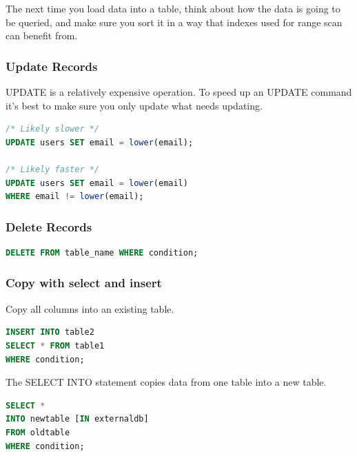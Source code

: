 \documentclass{article}
\begin{document}
The next time you load data into a table, think about how the data is going to be queried, and make sure you sort it in a way that indexes used for range scan can benefit from.

\subsubsection{Update Records}
UPDATE is a relatively expensive operation. To speed up an UPDATE command it's best to make sure you only update what needs updating.

\vspace{8pt} \begin{lstlisting}[language=SQL]
/* Likely slower */
UPDATE users SET email = lower(email); 

/* Likely faster */
UPDATE users SET email = lower(email)
WHERE email != lower(email);
\end{lstlisting} \vspace{8pt}

\subsubsection{Delete Records}

\vspace{8pt} \begin{lstlisting}[language=SQL]
DELETE FROM table_name WHERE condition;
\end{lstlisting} \vspace{8pt}

\subsubsection{Copy with select and insert}
Copy all columns into an existing table.

\vspace{8pt} \begin{lstlisting}[language=SQL]
INSERT INTO table2
SELECT * FROM table1
WHERE condition;
\end{lstlisting} \vspace{8pt}

The SELECT INTO statement copies data from one table into a new table.
\vspace{8pt} \begin{lstlisting}[language=SQL]
SELECT *
INTO newtable [IN externaldb]
FROM oldtable
WHERE condition;
\end{lstlisting} \vspace{8pt}
\end{document}
